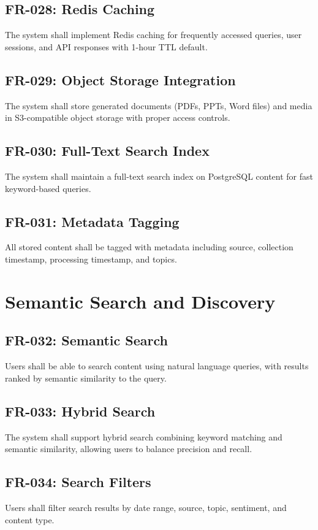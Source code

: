 \documentclass{report}
\begin{document}
\subsection{FR-028: Redis Caching}
The system shall implement Redis caching for frequently accessed queries, user sessions, and API responses with 1-hour TTL default.

\subsection{FR-029: Object Storage Integration}
The system shall store generated documents (PDFs, PPTs, Word files) and media in S3-compatible object storage with proper access controls.

\subsection{FR-030: Full-Text Search Index}
The system shall maintain a full-text search index on PostgreSQL content for fast keyword-based queries.

\subsection{FR-031: Metadata Tagging}
All stored content shall be tagged with metadata including source, collection timestamp, processing timestamp, and topics.

\section{Semantic Search and Discovery}

\subsection{FR-032: Semantic Search}
Users shall be able to search content using natural language queries, with results ranked by semantic similarity to the query.

\subsection{FR-033: Hybrid Search}
The system shall support hybrid search combining keyword matching and semantic similarity, allowing users to balance precision and recall.

\subsection{FR-034: Search Filters}
Users shall filter search results by date range, source, topic, sentiment, and content type.
\end{document}
